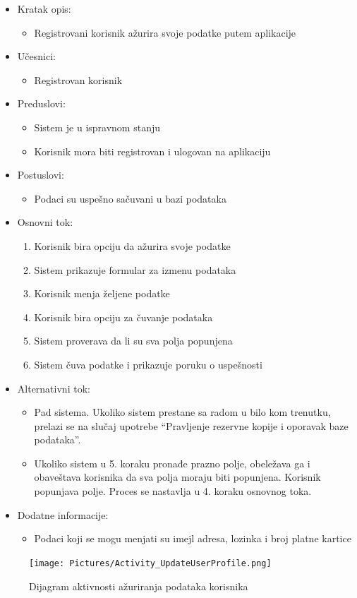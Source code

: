 \begin{itemize}
    \item Kratak opis:
        \begin{itemize}
            \item Registrovani korisnik ažurira svoje podatke putem aplikacije
        \end{itemize}
    \item Učesnici:
        \begin{itemize}
            \item Registrovan korisnik
        \end{itemize}
    \item Preduslovi:
        \begin{itemize}
            \item Sistem je u ispravnom stanju
            \item Korisnik mora biti registrovan i ulogovan na aplikaciju
        \end{itemize}
    \item Postuslovi:
        \begin{itemize}
            \item Podaci su uspešno sačuvani u bazi podataka
        \end{itemize}
    \item Osnovni tok:
        \begin{enumerate}
            \item Korisnik bira opciju da ažurira svoje podatke
            \item Sistem prikazuje formular za izmenu podataka
            \item Korisnik menja željene podatke 
            \item Korisnik bira opciju za čuvanje podataka
            \item Sistem proverava da li su sva polja popunjena
            \item Sistem čuva podatke i prikazuje poruku o uspešnosti
        \end{enumerate}
    \item Alternativni tok:
        \begin{itemize}
            \item Pad sistema. Ukoliko sistem prestane sa radom u bilo kom trenutku, prelazi se na slučaj upotrebe ``Pravljenje rezervne kopije i oporavak baze podataka''.
            \item Ukoliko sistem u 5. koraku pronađe prazno polje, obeležava ga i obaveštava korisnika da sva polja moraju biti popunjena. Korisnik popunjava polje. Proces se nastavlja u 4. koraku osnovnog toka.
        \end{itemize}
    \item Dodatne informacije:
        \begin{itemize}
            \item Podaci koji se mogu menjati su imejl adresa, lozinka i broj platne kartice
        \end{itemize}
\end{itemize}

\begin{figure}[H]
\begin{center}
\texttt{[image: Pictures/Activity\_UpdateUserProfile.png]}
\end{center}
    \caption{Dijagram aktivnosti ažuriranja podataka korisnika}
\label{fig:ActivityUpdateUserProfile}
\end{figure}
